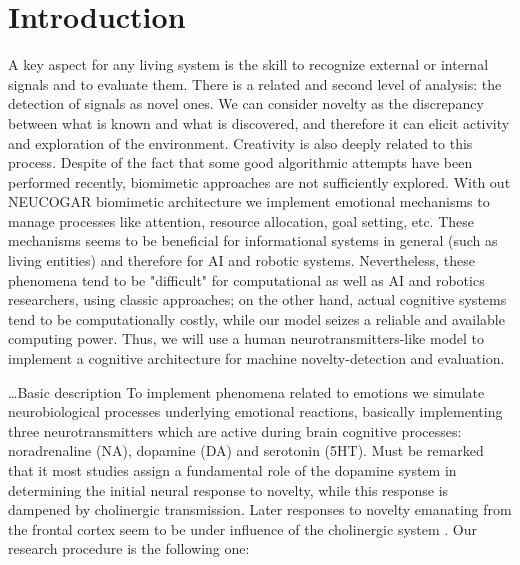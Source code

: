 \documentclass[oribibl]{llncs}
\begin{document}
\section{Introduction}\label{intro}
A key aspect for any living system is the skill to recognize external or internal signals and to evaluate them\cite{signal}. 
There is a related and second level of analysis: the detection of signals as novel ones\cite{novelty}\cite{novelty2}. 
We can consider novelty as the discrepancy between what is known and what is discovered, and therefore it can elicit activity and exploration of the environment. Creativity is also deeply related to this process\cite{cognitionandcreativity}\cite{creativityscience}. 
Despite of the fact that some good algorithmic attempts have been performed recently\cite{signal2}, 
biomimetic approaches are not sufficiently explored. With out NEUCOGAR biomimetic architecture we implement 
emotional mechanisms to manage processes like attention, resource allocation, goal setting, etc. 
These mechanisms seems to be beneficial for informational systems in general (such as living entities) 
and therefore for AI and robotic systems. Nevertheless, these phenomena tend to be "difficult" for computational as well as AI and robotics
researchers, using classic approaches; on the other hand, actual cognitive systems tend to be 
computationally costly, while our model seizes a reliable and available computing power. Thus, 
we will use a human neurotransmitters-like model to implement a cognitive architecture for machine novelty-detection and evaluation.



\ldots Basic  description
To implement phenomena related to emotions we simulate neurobiological processes
underlying emotional reactions, basically implementing three neurotransmitters which are active during brain cognitive processes:
noradrenaline (NA), dopamine (DA) and serotonin (5HT). Must be remarked that it most studies assign a fundamental role of the
dopamine system in determining the initial neural response to novelty, while this response is dampened by cholinergic transmission.
Later responses to novelty emanating from the frontal cortex seem to be under influence of the cholinergic system \cite{neurotransmitters}.
Our research procedure is the following one:
\end{document}
